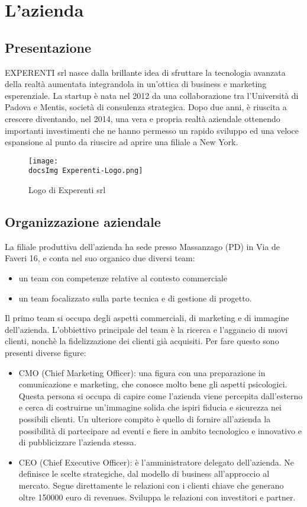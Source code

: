 \section{L'azienda}
\subsection{Presentazione}
EXPERENTI srl nasce dalla brillante idea di sfruttare la tecnologia avanzata della realt\`a aumentata integrandola in un'ottica di business e marketing esperenziale.
La startup \`e nata nel 2012 da una collaborazione tra l’Università di Padova e Mentis, società di consulenza strategica. Dopo due anni, \`e riuscita a crescere diventando, nel 2014, una vera e propria realt\`a aziendale ottenendo importanti investimenti che ne hanno permesso un rapido sviluppo ed una veloce espansione al punto da riuscire ad aprire una filiale a New York.

\begin{figure}[H]
	\centering
	\texttt{[image: \\docsImg Experenti-Logo.png]}
	\caption{Logo di Experenti srl}
	\label{fig:Logo di Experenti srl}
\end{figure}

\subsection{Organizzazione aziendale}
La filiale produttiva dell’azienda ha sede presso Massanzago (PD) in Via de Faveri 16, e conta nel suo organico due diversi team: 
\begin{itemize}
\item un team con competenze relative al contesto commerciale
\item un team focalizzato sulla parte tecnica e di gestione di progetto.
\end{itemize}

Il primo team si occupa degli aspetti commerciali, di marketing e di immagine dell'azienda. L'obbiettivo principale del team \`e la ricerca e l'aggancio di nuovi clienti, nonch\`e la fidelizzazione dei clienti gi\`a acquisiti. Per fare questo sono presenti diverse figure:
\begin{itemize}
	\item CMO (Chief Marketing Officer): una figura con una preparazione in comunicazione e marketing, che conosce molto bene gli aspetti psicologici. Questa persona si occupa di capire come l'azienda viene percepita dall'esterno e cerca di costruirne un'immagine solida che ispiri fiducia e sicurezza nei possibili clienti. Un ulteriore compito \`e quello di fornire all'azienda la possibilit\`a di partecipare ad eventi e fiere in ambito tecnologico e innovativo e di pubblicizzare l'azienda stessa.
	\item CEO (Chief Executive Officer): \`e l'amministratore delegato dell'azienda. Ne definisce le scelte strategiche, dal modello di business all'approccio al mercato. Segue direttamente le relazioni con i clienti chiave che generano oltre 150000 euro di revenues. Sviluppa le relazioni con investitori e partner.
\end{itemize}


